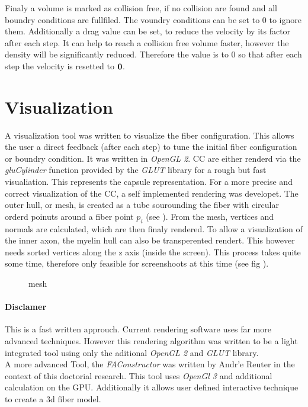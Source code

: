 % 
Finaly a volume is marked as collision free, if no collision are found and all boundry conditions are fullfiled. 
The voundry conditions can be set to 0 to ignore them.
Additionally a drag value can be set, to reduce the velocity by its factor after each step.
It can help to reach a collision free volume faster, however the density will be significantly reduced.
Therefore the value is to 0 so that after each step the velocity is resetted to $\mathbf{0}$. 
% 
% 
\section{Visualization}
% 
A visualization tool was written to visualize the fiber configuration. This allows the user a direct feedback (\eg after each step) to tune the initial fiber configuration or boundry condition. It was written in \textit{OpenGL 2}.
% 
\ac{CC} are either renderd via the \textit{gluCylinder} function provided by the \textit{GLUT} library for a rough but fast visualiation. This represents the capsule representation. For a more precise and correct visualization of the \ac{CC}, a self implemented rendering was developet. The outer hull, or mesh, is created as a tube sourounding the fiber with circular orderd poinuts around a fiber point $p_i$ (see \dummy).
% 
From the mesh, vertices and normals are calculated, which are then finaly rendered. To allow a visualization of the inner axon, the myelin hull can also be transperented rendert. This however needs sorted vertices along the z axis (inside the screen). This process takes quite some time, therefore only feasible for screenshoots at this time (see fig \dummy).
% 
\begin{figure}[!t]
    \def\tikzwidth{\textwidth}
	\caption{mesh}
	\label{fig:vis_mesh}
\end{figure}
% 
\paragraph{Disclamer}
This is a fast written approuch. Current rendering software uses far more advanced techniques. However this rendering algorithm was written to be a light integrated tool using only the aditional \textit{OpenGL 2} and \textit{GLUT} library.\\
% 
A more advanced Tool, the \textit{FAConstructor} \cite{Reuter2019} was written by Andr'e Reuter in the context of this doctorial research. This tool uses \textit{OpenGl 3} and additional calculation on the GPU. Additionally it allows user defined interactive technique to create a 3d fiber model.
%  
% 
% 
% 
